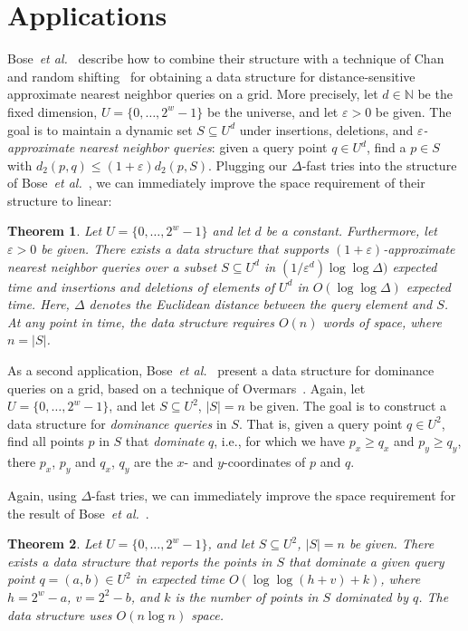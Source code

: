 \documentclass[a4paper,11pt]{article}
\newtheorem{theorem} {Theorem}[section]
\newcommand{\eps}{\varepsilon}
\newcommand{\N}{\mathbb{N}}
\newcommand{\etal}{\emph{et al.}\xspace}
\newcommand{\?}{\mskip1.5mu}
\begin{document}
\section{Applications}

Bose~\etal~\cite{BoseDoDuHoMo13} describe how to combine their structure
with a technique of Chan~\cite{Chan02} and random 
shifting~\cite[Chapter~11]{HarPeled11} for obtaining a data structure for 
distance-sensitive
approximate nearest neighbor queries on a grid.
More precisely, let $d \in \N$ be the fixed dimension, 
$U = \{0, \dots, 2^{w}-1\}$ be the universe, and
let $\eps > 0$ be given.
The goal is to maintain a dynamic set $S \subseteq U^d$ under
insertions, deletions, and \emph{$\eps$-approximate
nearest neighbor queries}: given a query point $q \in U^d$,
find a $p \in S$ with $d_2(p,q) \leq (1+\eps)d_2(p, S)$.
Plugging our $\Delta$-fast tries into the structure of
Bose~\etal~\cite[Theorem~9]{BoseDoDuHoMo13}, we can
immediately improve the space requirement of their structure to linear:
\begin{theorem}
Let $U = \{0, \dots, 2^w-1\}$ and let $d$ be a constant.
Furthermore, let $\eps > 0$ be given.
There exists a data structure that supports $(1+\eps)$-approximate
nearest neighbor queries over a subset $S \subseteq U^d$ in 
$(1/\eps^d)\log\log \Delta)$ expected time and insertions and deletions
of elements of $U^d$ in $O(\log\log \Delta)$ expected time.
Here, $\Delta$ denotes the Euclidean distance between the query element
and $S$. At any point in time, the data structure requires $O(n)$
words of space, where $n  = |S|$.
\end{theorem}

As a second application, Bose~\etal~\cite{BoseDoDuHoMo13}
present a data structure for dominance queries on a grid,
based on a technique of Overmars~\cite{Overmars88}.
Again, let $U = \{0, \dots, 2^w-1\}$, and let $S \subseteq U^2$,
$|S| = n$ be given. The goal is to construct a data structure
for \emph{dominance queries} in $S$. That is, given a query point
$q \in U^2$, find all points $p$ in $S$ that \emph{dominate} $q$,
i.e., for which we have $p_x \geq q_x$ and $p_y \geq q_y$, there
$p_x$, $p_y$ and $q_x$, $q_y$ are the $x$- and $y$-coordinates 
of $p$ and $q$.

Again, using $\Delta$-fast tries, we can immediately improve the
space requirement for the result of 
Bose~\etal~\cite[Theorem~10, Corollary~13]{BoseDoDuHoMo13}.

\begin{theorem}
Let $U = \{0, \dots, 2^w-1\}$, and let $S \subseteq U^2$, $|S|=n$
be given. There exists a data structure that reports the points in $S$
that dominate a given query point $q = (a,b) \in U^2$ in expected time
$O(\log\log(h+v) + k)$, where $h = 2^w - a$, $v = 2^2-b$, and $k$
is the number of points in $S$ dominated by $q$.
The data structure uses $O(n \log n)$ space.
\end{theorem}
\end{document}
